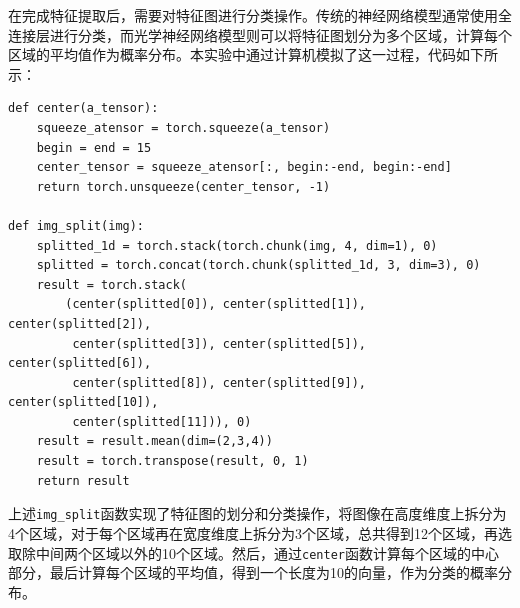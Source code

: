 在完成特征提取后，需要对特征图进行分类操作。传统的神经网络模型通常使用全连接层进行分类，而光学神经网络模型则可以将特征图划分为多个区域，计算每个区域的平均值作为概率分布。本实验中通过计算机模拟了这一过程，代码如下所示：

\newpage

\begin{lstlisting}[style=Python]
def center(a_tensor):
    squeeze_atensor = torch.squeeze(a_tensor)
    begin = end = 15
    center_tensor = squeeze_atensor[:, begin:-end, begin:-end]
    return torch.unsqueeze(center_tensor, -1)

def img_split(img):
    splitted_1d = torch.stack(torch.chunk(img, 4, dim=1), 0)
    splitted = torch.concat(torch.chunk(splitted_1d, 3, dim=3), 0)
    result = torch.stack(
        (center(splitted[0]), center(splitted[1]), center(splitted[2]),
         center(splitted[3]), center(splitted[5]), center(splitted[6]),
         center(splitted[8]), center(splitted[9]), center(splitted[10]),
         center(splitted[11])), 0)
    result = result.mean(dim=(2,3,4))
    result = torch.transpose(result, 0, 1)
    return result
\end{lstlisting}

上述\texttt{img\_split}函数实现了特征图的划分和分类操作，将图像在高度维度上拆分为4个区域，对于每个区域再在宽度维度上拆分为3个区域，总共得到12个区域，再选取除中间两个区域以外的10个区域。然后，通过\texttt{center}函数计算每个区域的中心部分，最后计算每个区域的平均值，得到一个长度为10的向量，作为分类的概率分布。


